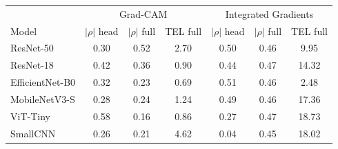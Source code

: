 \begin{tabular}{lcccccc}
\hline
 & \multicolumn{3}{c}{Grad-CAM} & \multicolumn{3}{c}{Integrated Gradients} \\
Model & $|\rho|$ head & $|\rho|$ full & TEL full & $|\rho|$ head & $|\rho|$ full & TEL full \\
\hline
ResNet-50 & 0.30 & 0.52 & 2.70 & 0.50 & 0.46 & 9.95 \\
ResNet-18 & 0.42 & 0.36 & 0.90 & 0.44 & 0.47 & 14.32 \\
EfficientNet-B0 & 0.32 & 0.23 & 0.69 & 0.51 & 0.46 & 2.48 \\
MobileNetV3-S & 0.28 & 0.24 & 1.24 & 0.49 & 0.46 & 17.36 \\
ViT-Tiny & 0.58 & 0.16 & 0.86 & 0.27 & 0.47 & 18.73 \\
SmallCNN & 0.26 & 0.21 & 4.62 & 0.04 & 0.45 & 18.02 \\
\hline
\end{tabular}